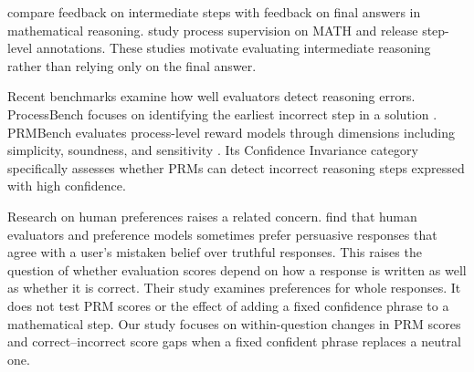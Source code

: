 \citet{uesato2022} compare feedback on intermediate steps with feedback on final answers in mathematical reasoning. \citet{lightman2023} study process supervision on MATH and release step-level annotations. These studies motivate evaluating intermediate reasoning rather than relying only on the final answer.

Recent benchmarks examine how well evaluators detect reasoning errors. ProcessBench focuses on identifying the earliest incorrect step in a solution \citep{zheng2025}. PRMBench evaluates process-level reward models through dimensions including simplicity, soundness, and sensitivity \citep{song2025}. Its Confidence Invariance category specifically assesses whether PRMs can detect incorrect reasoning steps expressed with high confidence.

Research on human preferences raises a related concern. \citet{sharma2023} find that human evaluators and preference models sometimes prefer persuasive responses that agree with a user's mistaken belief over truthful responses. This raises the question of whether evaluation scores depend on how a response is written as well as whether it is correct. Their study examines preferences for whole responses. It does not test PRM scores or the effect of adding a fixed confidence phrase to a mathematical step. Our study focuses on within-question changes in PRM scores and correct–incorrect score gaps when a fixed confident phrase replaces a neutral one.
